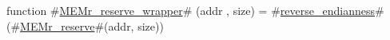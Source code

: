 function #\hyperref[sailMIPSzMEMrzyreservezywrapper]{MEMr\_reserve\_wrapper}# (addr , size) =
    #\hyperref[sailMIPSzreversezyendianness]{reverse\_endianness}#(#\hyperref[sailMIPSzMEMrzyreserve]{MEMr\_reserve}#(addr, size))

